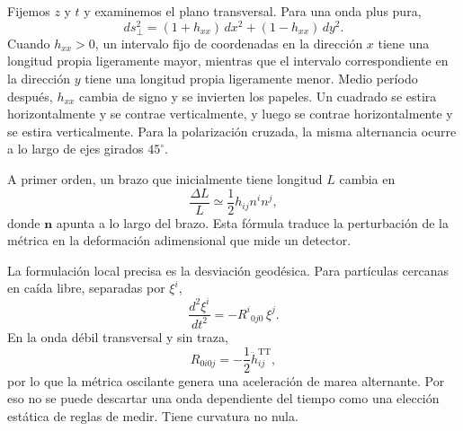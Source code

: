 Fijemos \(z\) y \(t\) y examinemos el plano transversal. Para una onda plus pura,
\begin{equation}
 ds_\perp^2
 =(1+h_{xx})\,dx^2+(1-h_{xx})\,dy^2.
 \label{eq:transverse-distance}
\end{equation}
Cuando \(h_{xx}>0\), un intervalo fijo de coordenadas en la dirección \(x\) tiene una longitud propia ligeramente mayor, mientras que el intervalo correspondiente en la dirección \(y\) tiene una longitud propia ligeramente menor. Medio período después, \(h_{xx}\) cambia de signo y se invierten los papeles. Un cuadrado se estira horizontalmente y se contrae verticalmente, y luego se contrae horizontalmente y se estira verticalmente. Para la polarización cruzada, la misma alternancia ocurre a lo largo de ejes girados \(45^\circ\).

A primer orden, un brazo que inicialmente tiene longitud \(L\) cambia en
\begin{equation}
 \frac{\Delta L}{L}\simeq\frac12 h_{ij}n^i n^j,
 \label{eq:fractional-strain}
\end{equation}
donde \(\mathbf n\) apunta a lo largo del brazo. Esta fórmula traduce la perturbación de la métrica en la deformación adimensional que mide un detector.

\begin{classroomqa}
\end{classroomqa}

La formulación local precisa es la desviación geodésica. Para partículas cercanas en caída libre, separadas por \(\xi^i\),
\begin{equation}
 \frac{d^2\xi^i}{dt^2}
 =-R^i{}_{0j0}\,\xi^j.
 \label{eq:geodesic-deviation}
\end{equation}
En la onda débil transversal y sin traza,
\begin{equation}
 R_{0i0j}=-\frac12\ddot h^{\mathrm{TT}}_{ij},
 \label{eq:tidal-curvature}
\end{equation}
por lo que la métrica oscilante genera una aceleración de marea alternante. Por eso no se puede descartar una onda dependiente del tiempo como una elección estática de reglas de medir. Tiene curvatura no nula.

